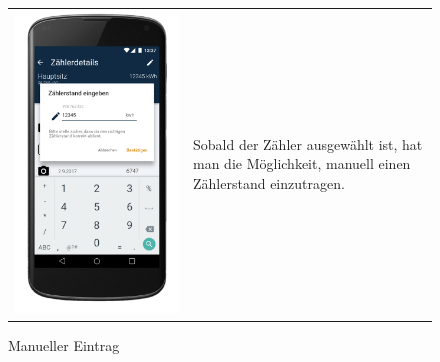 \begin{figure}[h]
\begin{tabularx}{\textwidth}{X  X}
	\includegraphics[scale = 0.155]{img/AndroidMockup/manuelEntry} \caption{Manueller Eintrag}&  Sobald der Zähler ausgewählt ist, hat man die Möglichkeit, manuell einen Zählerstand einzutragen. \\

\end{tabularx}
\end{figure}
